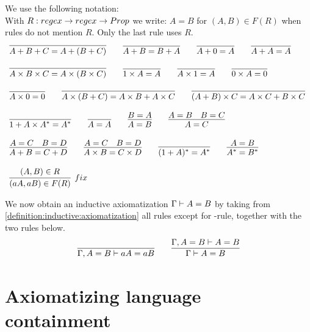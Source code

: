 \documentclass[a4paper,UKenglish,cleveref, autoref, thm-restate]{lipics-v2021}
\begin{document}
\begin{definition}
We use the following notation:\\
With $R : regex  \rightarrow regex \rightarrow Prop$ we write:
$A = B$ for $(A,B) \in F(R)$ when rules do not mention $R$. Only the last rule uses $R$.
\label{definition:coinductive:axiomatization}
\begin{displaymath}
\begin{array}{llll}
\myaxiom{A + B + C}{A + (B + C)} \qquad  
\myaxiom{A + B}{B + A} \qquad 
\myaxiom{A + 0}{A} \qquad
\myaxiom{A + A}{A} \qquad
\\\\
\myaxiom{A \times B \times C}{A \times (B \times C)} \qquad
\myaxiom{1 \times A}{A} \qquad
\myaxiom{A \times 1}{A} \qquad 
\myaxiom{0 \times A}{0} \qquad
\\\\
\myaxiom{A \times 0}{0} \qquad
\myaxiom{A \times (B + C)} {A \times B + A \times C} \qquad
\myaxiom{(A + B)\times C}{A \times C + B \times C}
\\\\
\myaxiom{1 + A \times A^*}{A^* } \qquad 
\myaxiom{A}{A}\qquad
\infer{\eqBodyE{A}{B}}{\eqBodyE{B}{A}}\qquad
\infer{\eqBodyE{A}{C}}{\eqBodyE{A}{B} & \eqBodyE{B}{C}}\qquad
\\\\
\infer{\eqBodyE{A + B}{ C + D}}
  {\eqBodyE{A}{C} & \eqBodyE{B}{D}}\qquad
\infer{\eqBodyE{A \times B}{ C \times D}}
  {\eqBodyE{A}{C} & \eqBodyE{B}{D}}\qquad
\myaxiom{(1 + A)^*}{A^*} \qquad 
\infer{\eqBodyE{A^*}{B^*}}
  {\eqBodyE{A}{B}} 
\\\\
\infer[fix]{(aA,aB) \in F(R)}{(A,B) \in R}
\end{array}
\end{displaymath}
\end{definition}

\begin{definition} \label{definition:inductive:axiomatization}
We now obtain an inductive axiomatization $\Gamma \vdash A = B$ by taking from \ref{definition:inductive:axiomatization} all rules except for -rule, together with the two rules below.
\begin{displaymath}
\myaxiomE{\Gamma , A = B}{aA}{aB} \qquad
\infer{\Gamma \vdash A = B}{\Gamma, A = B \vdash A = B}
\end{displaymath}
\end{definition}
\section{Axiomatizing language containment}
\end{document}
